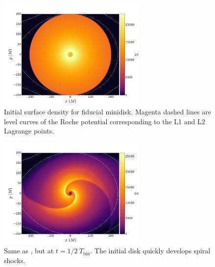 \begin{figure}
\begin{center}
\includegraphics[width=0.65\textwidth]{figures/minidisk/q011_m3_sig_0000.pdf}
\end{center}
\caption{ Initial surface density for fiducial minidisk.  Magenta dashed lines are level curves of the Roche potential corresponding to the L1 and L2 Lagrange points.}
\end{figure}

\begin{figure}
\begin{center}
\includegraphics[width=0.65\textwidth]{figures/minidisk/q011_m3_sig_0050.pdf}
\end{center}
\caption{ Same as , but at $t = 1/2\ T_\text{bin}$.  The initial disk quickly develops spiral shocks.}
\end{figure}

